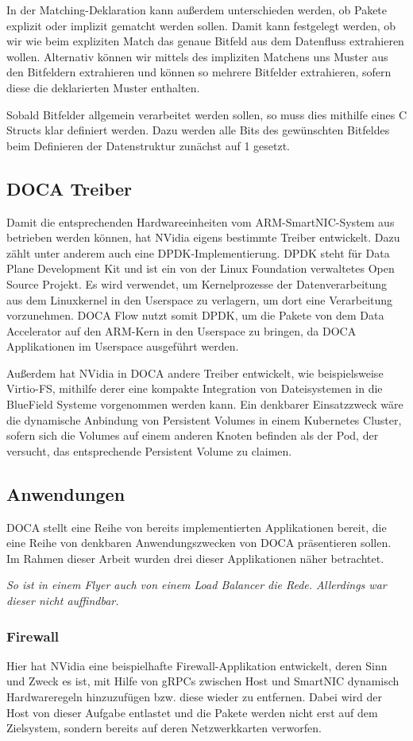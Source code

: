 In der Matching-Deklaration kann außerdem unterschieden werden, ob Pakete explizit oder implizit gematcht werden sollen. Damit kann festgelegt werden, ob wir wie beim expliziten Match das genaue Bitfeld aus dem Datenfluss extrahieren wollen. Alternativ können wir mittels des impliziten Matchens uns Muster aus den Bitfeldern extrahieren und können so mehrere Bitfelder extrahieren, sofern diese die deklarierten Muster enthalten.

Sobald Bitfelder allgemein verarbeitet werden sollen, so muss dies mithilfe eines C Structs klar definiert werden. Dazu werden alle Bits des gewünschten Bitfeldes beim Definieren der Datenstruktur zunächst auf 1 gesetzt.
\subsection{DOCA Treiber}
Damit die entsprechenden Hardwareeinheiten vom ARM-SmartNIC-System aus betrieben werden können, hat NVidia eigens bestimmte Treiber entwickelt. Dazu zählt unter anderem auch eine DPDK-Implementierung. DPDK steht für Data Plane Development Kit und ist ein von der Linux Foundation verwaltetes Open Source Projekt. Es wird verwendet, um Kernelprozesse der Datenverarbeitung aus dem Linuxkernel in den Userspace zu verlagern, um dort eine Verarbeitung vorzunehmen. DOCA Flow nutzt somit DPDK, um die Pakete von dem Data Accelerator auf den ARM-Kern in den Userspace zu bringen, da DOCA Applikationen im Userspace ausgeführt werden. 

Außerdem hat NVidia in DOCA andere Treiber entwickelt, wie beispielsweise Virtio-FS, mithilfe derer eine kompakte Integration von Dateisystemen in die BlueField Systeme vorgenommen werden kann. Ein denkbarer Einsatzzweck wäre die dynamische Anbindung von Persistent Volumes in einem Kubernetes Cluster, sofern sich die Volumes auf einem anderen Knoten befinden als der Pod, der versucht, das entsprechende Persistent Volume zu claimen.
\subsection{Anwendungen}
DOCA stellt eine Reihe von bereits implementierten Applikationen bereit, die eine Reihe von denkbaren Anwendungszwecken von DOCA präsentieren sollen. Im Rahmen dieser Arbeit wurden drei dieser Applikationen näher betrachtet.

\textit{So ist in einem Flyer auch von einem Load Balancer die Rede. Allerdings war dieser nicht auffindbar.}

\subsubsection{Firewall}
Hier hat NVidia eine beispielhafte Firewall-Applikation entwickelt, deren Sinn und Zweck es ist, mit Hilfe von gRPCs zwischen Host und SmartNIC dynamisch Hardwareregeln hinzuzufügen bzw. diese wieder zu entfernen. Dabei wird der Host von dieser Aufgabe entlastet und die Pakete werden nicht erst auf dem Zielsystem, sondern bereits auf deren Netzwerkkarten verworfen.

